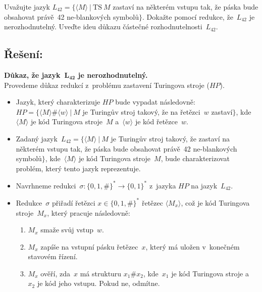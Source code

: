 \documentclass[a4paper, 11pt]{scrartcl}
\begin{document}
	Uvažujte jazyk $ L_{42} = \{\langle M \rangle\ |\ \text{TS}\ M $
	zastaví na některém vstupu tak, že páska bude obsahovat
	právě~42 ne-blankových symbolů$ \} $. Dokažte pomocí redukce,
	že~$ L_{42} $ je nerozhodnutelný. Uveďte ideu důkazu částečné
	rozhodnutelnosti~$ L_{42} $.

	\subsection*{Řešení:}

	\textbf{Důkaz, že jazyk~$ \boldsymbol{L_{42}} $ je nerozhodnutelný.} \\
	Provedeme důkaz redukcí z~problému zastavení Turingova stroje ($ HP $).
	\begin{itemize}
		\item
			Jazyk, který charakterizuje $ HP $ bude vypadat následovně: \\
			$ HP = \{\langle M \rangle \# \langle w \rangle\ |\ M $ je
			Turingův stroj takový, že na řetězci~$ w $ zastaví$ \} $,
			kde~$ \langle M \rangle $ je kód Turingova stroje~$ M $
			a~$ \langle w \rangle $ je kód řetězce~$ w $.

		\item
			Zadaný jazyk~$ L_{42} = \{ \langle M \rangle\ |\ M $ je
			Turingův stroj takový, že zastaví na některém vstupu tak,
			že páska bude obsahovat právě~42 ne-blankových symbolů$ \} $,
			kde~$ \langle M \rangle $ je kód Turingova stroje~$ M $, bude
			charakterizovat problém, který tento jazyk reprezentuje.

		\item
			Navrhneme redukci~$ \sigma : \{0, 1, \#\}^* \rightarrow
			\{0, 1\}^* $ z~jazyka $ HP $ na jazyk~$ L_{42} $.

		\item
			Redukce~$ \sigma $ přiřadí řetězci $ x \in \{0, 1, \#\}^* $
			řetězec $ \langle M_x \rangle $, což je kód Turingova
			stroje~$ M_x $, který pracuje následovně:

			\begin{enumerate}
				\item
					$ M_x $ smaže svůj vstup~$ w $.

				\item
					$ M_x $ zapíše na vstupní pásku řetězec~$ x $,
					který má uložen v~konečném stavovém řízení.

				\item
					$ M_x $ ověří, zda~$ x $ má strukturu $ x_1\#x_2 $,
					kde~$ x_1 $ je kód Turingova stroje a~$ x_2 $ je
					kód jeho vstupu. Pokud ne, odmítne.


\end{enumerate}
\end{itemize}
\end{document}
